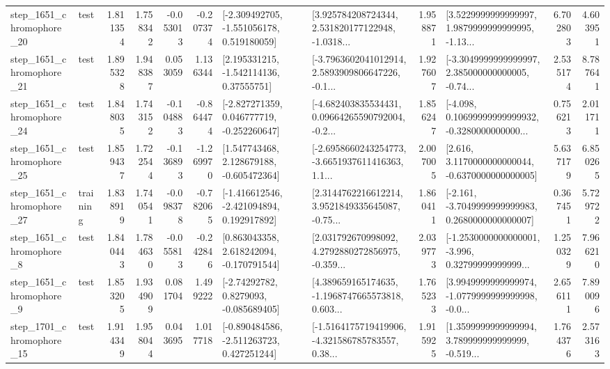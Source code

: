 \begin{tabular}{llrrrrllrlrr}
 step\_1651\_chromophore\_20 &      test &      1.811354 &    1.758342 &     -0.053013 & -0.207374 &   [-2.309492705, -1.551056178, 0.519180059] &  [3.925784208724344, 2.531820177122948, -1.0318... &       1.958871 &  [3.5229999999999997, 1.9879999999999995, -1.13... &            6.702803 &          4.603951 \\
 step\_1651\_chromophore\_21 &      test &      1.895328 &    1.948387 &      0.053059 &  1.136344 &     [2.195331215, -1.542114136, 0.37555751] &  [-3.7963602041012914, 2.5893909806647226, -0.1... &       1.927607 &  [-3.3049999999999997, 2.385000000000005, -0.74... &            2.535174 &          8.787641 \\
 step\_1651\_chromophore\_24 &      test &      1.848035 &    1.743152 &     -0.104883 & -0.864474 &   [-2.827271359, 0.046777719, -0.252260647] &  [-4.682403835534431, 0.09664265590792004, -0.2... &       1.856247 &  [-4.098, 0.10699999999999932, -0.3280000000000... &            0.756213 &          2.011711 \\
 step\_1651\_chromophore\_25 &      test &      1.859437 &    1.722544 &     -0.136893 & -1.269970 &    [1.547743468, 2.128679188, -0.605472364] &  [-2.6958660243254773, -3.6651937611416363, 1.1... &       2.007005 &   [2.616, 3.1170000000000044, -0.6370000000000005] &            5.637179 &          6.850265 \\
 step\_1651\_chromophore\_27 &  training &      1.838919 &    1.740541 &     -0.098378 & -0.782065 &   [-1.416612546, -2.421094894, 0.192917892] &  [2.3144762216612214, 3.9521849335645087, -0.75... &       1.860411 &  [-2.161, -3.7049999999999983, 0.2680000000000007] &            0.367451 &          5.729722 \\
  step\_1651\_chromophore\_8 &      test &      1.840443 &    1.784630 &     -0.055813 & -0.242846 &    [0.863043358, 2.618242094, -0.170791544] &  [2.031792670998092, 4.2792880272856975, -0.359... &       2.039773 &  [-1.2530000000000001, -3.996, 0.32799999999999... &            1.250329 &          7.966210 \\
  step\_1651\_chromophore\_9 &      test &      1.853205 &    1.934909 &      0.081704 &  1.499222 &      [-2.74292782, 0.8279093, -0.085689405] &  [4.389659165174635, -1.1968747665573818, 0.603... &       1.765233 &  [3.9949999999999974, -1.0779999999999998, -0.0... &            2.656111 &          7.890096 \\
 step\_1701\_chromophore\_15 &      test &      1.914349 &    1.958044 &      0.043695 &  1.017718 &   [-0.890484586, -2.511263723, 0.427251244] &  [-1.5164175719419906, -4.321586785783557, 0.38... &       1.915925 &  [1.3599999999999994, 3.789999999999999, -0.519... &            1.764376 &          2.573163 \\

\end{tabular}
